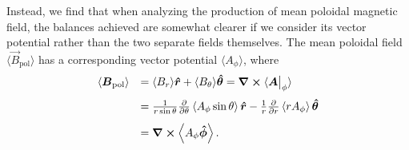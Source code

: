 Instead, we find that when analyzing the production of mean poloidal
magnetic field, the balances achieved are somewhat clearer if we
consider its vector potential rather than the two separate
fields themselves.  The mean poloidal field 
$\langle \vec{B}_\mathrm{pol} \rangle$ has a corresponding vector
potential $\langle A_\phi \rangle$, where  
\begin{equation}
  \label{eq:poloidal decomposition}
  \begin{array}{rl}
    \displaystyle
    \langle \boldsymbol{B}_\mathrm{pol} \rangle &= \langle B_r \rangle \boldsymbol{\hat{r}} +
    \langle B_\theta \rangle \boldsymbol{\hat{\theta}} = \boldsymbol{\nabla} \boldsymbol{\times} \langle \boldsymbol{A}\big|_\phi \rangle \\[3mm]
    \displaystyle
    &= \frac{1}{r \sin \theta} \frac{\partial}{\partial \theta}
    \left\langle A_\phi \sin \theta \right\rangle \boldsymbol{\hat{r}} - 
    \frac{1}{r} \frac{\partial}{\partial r} \left\langle r A_\phi \right\rangle \boldsymbol{\hat{\theta}} \\[3mm]
    \displaystyle
    &= \boldsymbol{\nabla} \boldsymbol{\times} \left\langle A_\phi \boldsymbol{\hat{\phi}} \right\rangle.
  \end{array}
\end{equation}

